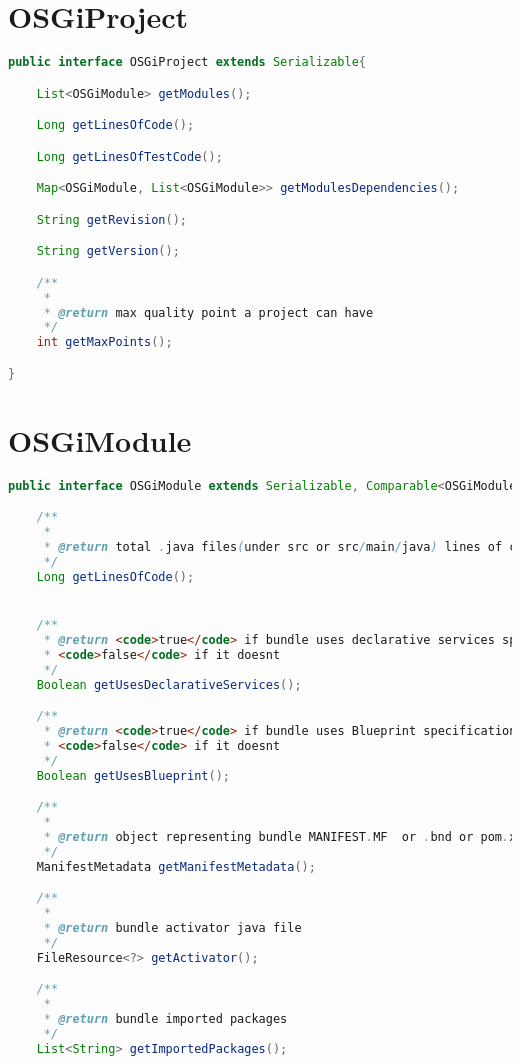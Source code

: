 \begin{appendices}
\section{OSGiProject}
\begin{lstlisting}[language=java,label=Intrabundle OSGiProject,caption=Intrabundle OSGiProject interface]
public interface OSGiProject extends Serializable{

    List<OSGiModule> getModules();

    Long getLinesOfCode();

    Long getLinesOfTestCode();

    Map<OSGiModule, List<OSGiModule>> getModulesDependencies();

    String getRevision();

    String getVersion();

    /**
     *
     * @return max quality point a project can have
     */
    int getMaxPoints();

}
\end{lstlisting}
\FloatBarrier

\section{OSGiModule}
\begin{lstlisting}[language=java,label=Intrabundle OSGiModule,caption=Intrabundle OSGiModule interface]
public interface OSGiModule extends Serializable, Comparable<OSGiModule>{

    /**
     *
     * @return total .java files(under src or src/main/java) lines of code
     */
    Long getLinesOfCode();


    /**
     * @return <code>true</code> if bundle uses declarative services specification
     * <code>false</code> if it doesnt
     */
    Boolean getUsesDeclarativeServices();

    /**
     * @return <code>true</code> if bundle uses Blueprint specification
     * <code>false</code> if it doesnt
     */
    Boolean getUsesBlueprint();

    /**
     *
     * @return object representing bundle MANIFEST.MF  or .bnd or pom.xml with maven-bundle-plugin
     */
    ManifestMetadata getManifestMetadata();

    /**
     *
     * @return bundle activator java file
     */
    FileResource<?> getActivator();

    /**
     *
     * @return bundle imported packages
     */
    List<String> getImportedPackages();


\end{lstlisting}
\end{appendices}
